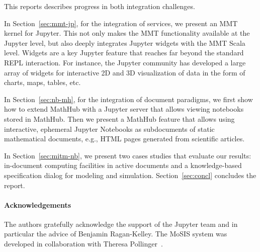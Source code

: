 
This reports describes progress in both integration challenges.

In Section~\ref{sec:mmt-jp}, for the integration of services, we present an MMT kernel for Jupyter.
This not only makes the MMT functionality available at the Jupyter level, but also deeply integrates Jupyter widgets with the MMT Scala level.
Widgets are a key Jupyter feature that reaches far beyond the standard REPL interaction.
For instance, the Jupyter community has developed a large array of widgets for interactive 2D and 3D visualization of data in the form of charts, maps, tables, etc.

In Section~\ref{sec:nb-mh}, for the integration of document paradigms, we first show how to extend MathHub with a Jupyter server that allows viewing notebooks stored in MathHub.
Then we present a MathHub feature that allows using interactive, ephemeral Jupyter Notebooks as subdocuments of static mathematical documents, e.g., HTML pages generated from scientific articles.

In Section~\ref{sec:mitm-nb}, we present two cases studies that evaluate our results: in-document computing facilities in active documents and a knowledge-based specification dialog for modeling and simulation.
Section~\ref{sec:concl} concludes the report.

\paragraph{Acknowledgements}
The authors gratefully acknowledge the support of the Jupyter team and in particular the advice of Benjamin Ragan-Kelley.
The MoSIS system was developed in collaboration with Theresa Pollinger~\cite{PolKohKoe:kacse18}. 


